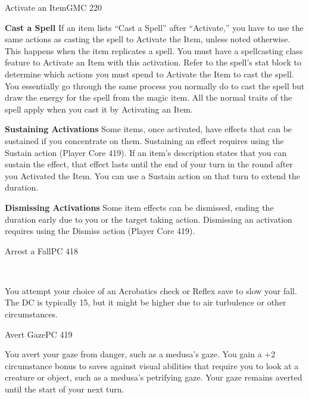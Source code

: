 \documentclass[12pt,openany,twocolumn]{book}
\begin{document}
\begin{action}{Activate an Item}{}{GMC 220}
\begin{actionbody}
        \textbf{Cast a Spell} If an item lists ``Cast a Spell'' after ``Activate,'' you have to use the same actions as casting the spell to Activate the Item, unless noted otherwise. This happens when the item replicates a spell. You must have a spellcasting class feature to Activate an Item with this activation. Refer to the spell's stat block to determine which actions you must spend to Activate the Item to cast the spell. You essentially go through the same process you normally do to cast the spell but draw the energy for the spell from the magic item. All the normal traits of the spell apply when you cast it by Activating an Item.

        \textbf{Sustaining Activations} Some items, once activated, have effects that can be sustained if you concentrate on them. Sustaining an effect requires using the Sustain action (Player Core 419). If an item's description states that you can sustain the effect, that effect lasts until the end of your turn in the round after you Activated the Item. You can use a Sustain action on that turn to extend the duration.

        \textbf{Dismissing Activations} Some item effects can be dismissed, ending the duration early due to you or the target taking action. Dismissing an activation requires using the Dismiss action (Player Core 419).
    \end{actionbody}
\end{action}

\begin{action}{Arrest a Fall}{\reaction{}}{PC 418}
    \begin{actioninfo}
         \\
    \end{actioninfo}

    \begin{actionbody}
        You attempt your choice of an Acrobatics check or Reflex save to slow your fall. The DC is typically 15, but it might be higher due to air turbulence or other circumstances.
    \end{actionbody}

\end{action}

\begin{action}{Avert Gaze}{}{PC 419}
    \begin{actionbody}
        You avert your gaze from danger, such as a medusa's gaze. You gain a +2 circumstance bonus to saves against visual abilities that require you to look at a creature or object, such as a medusa's petrifying gaze. Your gaze remains averted until the start of your next turn.
    \end{actionbody}
\end{action}
\end{document}
